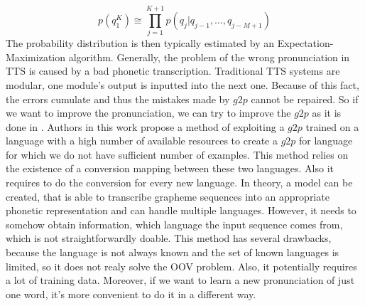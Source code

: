 {\begin{equation}
p(q_1^K) \cong \prod_{j=1}^{K+1} p(q_j\vert q_{j-1},\dots,q_{j-M+1})
\end{equation}
The probability distribution is then typically estimated by an Expectation-Maximization algorithm.
\linebreak \linebreak
Generally, the problem of the wrong pronunciation in TTS  is caused by a bad phonetic transcription.
Traditional TTS systems are modular, one module's output is inputted into the next one.
Because of this fact, the errors cumulate and thus the mistakes made by $g2p$ cannot be repaired.
So if we want to improve the pronunciation, we can try to improve the $g2p$ as it is done in \cite{deri2016grapheme}.
Authors in this work propose a method of exploiting a $g2p$ trained on a language with a high number of available resources to create a $g2p$ for language for which we do not have sufficient number of examples.
This method relies on the existence of a conversion mapping between these two languages.
Also it requires to do the conversion for every new language.
In theory, a model can be created, that is able to transcribe grapheme sequences into an appropriate phonetic representation and can handle multiple languages.
However, it needs to somehow obtain information, which language the input sequence comes from, which is not straightforwardly doable.
This method has several drawbacks, because the language is not always known and the set of known languages is limited, so it does not realy solve the OOV problem.
Also, it potentially requires a lot of training data.
Moreover, if we want to learn a new pronunciation of just one word, it's more convenient to do it in a different way.
}
